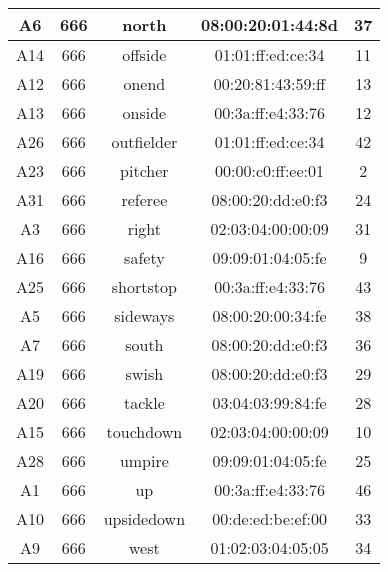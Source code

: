 \documentclass{article}
\begin{document}
\begin{table}[H]
\begin{tabular}{ | c | c | c | c | c | }
 \\ \hline
A6 & 666 & north & 08:00:20:01:44:8d & 37
 \\ \hline
A14 & 666 & offside & 01:01:ff:ed:ce:34 & 11
 \\ \hline
A12 & 666 & onend & 00:20:81:43:59:ff & 13
 \\ \hline
A13 & 666 & onside & 00:3a:ff:e4:33:76 & 12
 \\ \hline
A26 & 666 & outfielder & 01:01:ff:ed:ce:34 & 42
 \\ \hline
A23 & 666 & pitcher & 00:00:c0:ff:ee:01 & 2
 \\ \hline
A31 & 666 & referee & 08:00:20:dd:e0:f3 & 24
 \\ \hline
A3 & 666 & right & 02:03:04:00:00:09 & 31
 \\ \hline
A16 & 666 & safety & 09:09:01:04:05:fe & 9
 \\ \hline
A25 & 666 & shortstop & 00:3a:ff:e4:33:76 & 43
 \\ \hline
A5 & 666 & sideways & 08:00:20:00:34:fe & 38
 \\ \hline
A7 & 666 & south & 08:00:20:dd:e0:f3 & 36
 \\ \hline
A19 & 666 & swish & 08:00:20:dd:e0:f3 & 29
 \\ \hline
A20 & 666 & tackle & 03:04:03:99:84:fe & 28
 \\ \hline
A15 & 666 & touchdown & 02:03:04:00:00:09 & 10
 \\ \hline
A28 & 666 & umpire & 09:09:01:04:05:fe & 25
 \\ \hline
A1 & 666 & up & 00:3a:ff:e4:33:76 & 46
 \\ \hline
A10 & 666 & upsidedown & 00:de:ed:be:ef:00 & 33
 \\ \hline
A9 & 666 & west & 01:02:03:04:05:05 & 34
 \\ \hline
\end{tabular}
\end{table}
\end{document}
